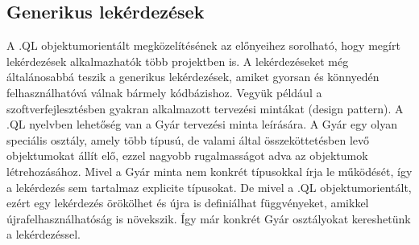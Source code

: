 \documentclass[a4paper,12pt]{report}
\begin{document}
\subsection{Generikus lekérdezések}
\par A .QL objektumorientált megközelítésének az előnyeihez sorolható, hogy megírt lekérdezések alkalmazhatók több projektben is. A lekérdezéseket még általánosabbá teszik a generikus lekérdezések, amiket gyorsan és könnyedén felhasználhatóvá válnak bármely kódbázishoz. Vegyük például a szoftverfejlesztésben gyakran alkalmazott tervezési mintákat (design pattern). A .QL nyelvben lehetőség van a Gyár tervezési minta leírására. A Gyár egy olyan speciális osztály, amely több típusú, de valami által összeköttetésben levő objektumokat állít elő, ezzel nagyobb rugalmasságot adva az objektumok létrehozásához. Mivel a Gyár minta nem konkrét típusokkal írja le működését, így a lekérdezés sem tartalmaz explicite típusokat. De mivel a .QL objektumorientált, ezért egy lekérdezés örökölhet és újra is definiálhat függvényeket, amikkel újrafelhasználhatóság is növekszik. Így már konkrét Gyár osztályokat kereshetünk a lekérdezéssel.
\end{document}
